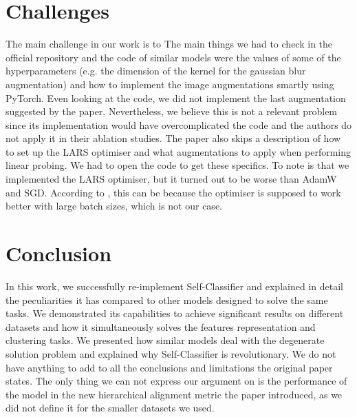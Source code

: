\documentclass{article}
\begin{document}
\section{Challenges}
\label{sec:challenges}
The main challenge in our work is to 
The main things we had to check in the official repository and the code of similar models were the values of some of the hyperparameters (e.g. the dimension of the kernel for the gaussian blur augmentation) and how to implement the image augmentations smartly using PyTorch.
Even looking at the code, we did not implement the last augmentation suggested by the paper. Nevertheless, we believe this is not a relevant problem since its implementation would have overcomplicated the code and the authors do not apply it in their ablation studies. 
The paper also skips a description of how to set up the LARS optimiser and what augmentations to apply when performing linear probing. We had to open the code to get these specifics. To note is that we implemented the LARS optimiser, but it turned out to be worse than AdamW and SGD. According to \cite{simsiam}, this can be because the optimiser is supposed to work better with large batch sizes, which is not our case.
    
\section{Conclusion}
\label{sec:conclusion}
In this work, we successfully re-implement Self-Classifier \cite{self_classifier} and explained in detail the peculiarities it has compared to other models designed to solve the same tasks. We demonstrated its capabilities to achieve significant results on different datasets and how it simultaneously solves the features representation and clustering tasks. We presented how similar models deal with the degenerate solution problem and explained why Self-Classifier is revolutionary. 
We do not have anything to add to all the conclusions and limitations the original paper states. The only thing we can not express our argument on is the performance of the model in the new hierarchical alignment metric the paper introduced, as we did not define it for the smaller datasets we used.
\end{document}
